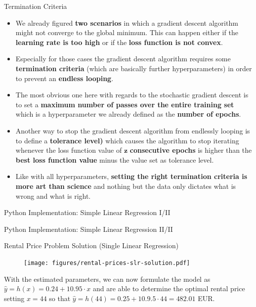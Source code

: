 \documentclass[document.tex]{subfiles}
\begin{document}
    \begin{frame}{Termination Criteria}
        \begin{itemize}
            \item We already figured \textbf{two scenarios} in which a gradient descent algorithm might not converge to the global minimum. This can happen either if the \textbf{learning rate is too high} or if the \textbf{loss function is not convex}.
            \item Especially for those cases the gradient descent algorithm requires some \textbf{termination criteria} (which are basically further hyperparameters) in order to prevent an \textbf{endless looping}.
            \item The most obvious one here with regards to the stochastic gradient descent is to set a \textbf{maximum number of passes over the entire training set} which is a hyperparameter we already defined as the \textbf{number of epochs}.
            \item Another way to stop the gradient descent algorithm from endlessly looping is to define a \textbf{tolerance level)} which causes the algorithm to stop iterating whenever the loss function value of $\pmb{z}$ \textbf{consecutive epochs} is higher than the \textbf{best loss function value} minus the value set as tolerance level.
            \item Like with all hyperparameters, \textbf{setting the right termination criteria is more art than science} and nothing but the data only dictates what is wrong and what is right.
        \end{itemize}
    \end{frame}

    \begin{frame}{Python Implementation: Simple Linear Regression I/II}
        
    \end{frame}
    
    \begin{frame}{Python Implementation: Simple Linear Regression II/II}
        
    \end{frame}
    
    \begin{frame}{Rental Price Problem Solution (Single Linear Regression)}
        \begin{figure}
            \label{fig:rental-prices-slr-solution}
            \texttt{[image: figures/rental-prices-slr-solution.pdf]}
        \end{figure}
    
        With the estimated parameters, we can now formulate the model as $\hat y = h(x) = 0.24 + 10.95 \cdot x$ and are able to determine the optimal rental price setting $x = 44$ so that $\hat y = h(44) = 0.25 + 10.9.5 \cdot 44 = 482.01$ EUR.
    \end{frame}
    
\end{document}
